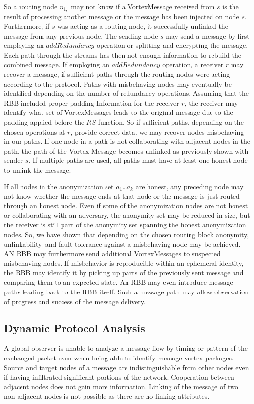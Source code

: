 \documentclass[10pt,journal,compsoc,twocolumn,twoside]{IEEEtran}
\begin{document}
So a routing node $n_{1,}$ may not know if a VortexMessage received from $s$ is the result of processing another message or the message has been injected on node $s$. Furthermore, if $s$ was acting as a routing node, it successfully unlinked the message from any previous node. The sending node $s$ may send a message by first employing an $addRedundancy$ operation or splitting and encrypting the message. Each path through the streams has then not enough information to rebuild the combined message. If employing an $addRedundancy$ operation, a receiver $r$ may recover a message, if sufficient paths through the routing nodes were acting according to the protocol. Paths with misbehaving nodes may eventually be identified depending on the number of redundancy operations. Assuming that the RBB included proper padding Information for the receiver $r$, the receiver may identify what set of VortexMessages leads to the original message due to the padding applied before the $RS$ function. So if sufficient paths, depending on the chosen operations at $r$, provide correct data, we may recover nodes misbehaving in our paths. If one node in a path is not collaborating with adjacent nodes in the path, the path of the Vortex Message becomes unlinked as previously shown with sender $s$. If multiple paths are used, all paths must have at least one honest node to unlink the message. 

If all nodes in the anonymization set $a_1$\ldots$a_k$ are honest, any preceding node may not know whether the message ends at that node or the message is just routed through an honest node. Even if some of the anonymization nodes are not honest or collaborating with an adversary, the anonymity set may be reduced in size, but the receiver is still part of the anonymity set spanning the honest anonymization nodes. So, we have shown that depending on the chosen routing block anonymity, unlinkability, and fault tolerance against a misbehaving node may be achieved. AN RBB may furthermore send additional VortexMessages to suspected misbehaving nodes. If misbehavior is reproducible within an ephemeral identity, the RBB may identify it by picking up parts of the previously sent message and comparing them to an expected state. An RBB may even introduce message paths leading back to the RBB itself. Such a message path may allow observation of progress and success of the message delivery.

\subsection{Dynamic Protocol Analysis\label{sec:dynamicAnalysis}}
A global observer is unable to analyze a message flow by timing or pattern of the exchanged packet even when being able to identify message vortex packages. Source and target nodes of a message are indistinguishable from other nodes even if having infiltrated significant portions of the network. Cooperation between adjacent nodes does not gain more information. Linking of the message of two non-adjacent nodes is not possible as there are no linking attributes.
\end{document}
